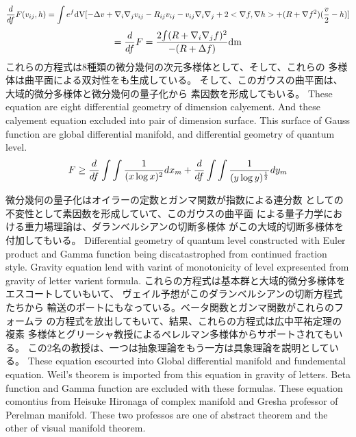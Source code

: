 \documentclass{jsarticle}
\begin{document}
  $$ {d \over d f}F(v_{ij},h) = \int {e^{f}\mathrm{dV}}
  [- \Delta v + \nabla_{i}\nabla_{j}
  v_{ij} - R_{ij}v_{ij} - v_{ij}\nabla_{i}\nabla_{j} + 2 <\nabla f,\nabla h>
  + (R + \nabla f^2)({v \over 2} - h)]$$
  $$ = {d \over d f}F = {2 {\int (R + \nabla_{i}\nabla_{j} f)^2} \over 
  { - (R + \Delta f)}}\mathrm{dm} $$
  これらの方程式は8種類の微分幾何の次元多様体として、そして、これらの
  多様体は曲平面による双対性をも生成している。 
  そして、このガウスの曲平面は、大域的微分多様体と微分幾何の量子化から
  素因数を形成してもいる。
  These equation are eight differential geometry of dimension calyement.
  And these calyement equation excluded into pair of dimension surface.
  This surface of Gauss function are global differential manifold,
  and differential geometry of quantum level.
  $$ F \ge {d \over d f}\int \int{1 \over (x \log x)^2}dx_m 
  + {d \over d f}\int \int{1 \over (y \log y)^{1 \over 2}}dy_m $$

  微分幾何の量子化はオイラーの定数とガンマ関数が指数による連分数
  としての不変性として素因数を形成していて、このガウスの曲平面
  による量子力学における重力場理論は、ダランベルシアンの切断多様体
  がこの大域的切断多様体を付加してもいる。
  Differential geometry of quantum level constructed with Euler product
  and Gamma function being discatastrophed from continued fraction style.
  Gravity equation lend with varint of monotonicity of level expresented
  from gravity of letter varient formula.
  これらの方程式は基本群と大域的微分多様体をエスコートしていもいて、
  ヴェイル予想がこのダランベルシアンの切断方程式たちから
  輸送のポートにもなっている。ベータ関数とガンマ関数がこれらのフォームラ
  の方程式を放出してもいて、結果、これらの方程式は広中平祐定理の複素
  多様体とグリーシャ教授によるペレルマン多様体からサポートされてもいる。
  この2名の教授は、一つは抽象理論をもう一方は具象理論を説明としている。
  These equation escourted into Global differential manifold and
  fundemental equation.
  Weil's theorem is imported from this equation in gravity of letters.
  Beta function and Gamma function are excluded with these formulas.
  These equation comontius from Heisuke Hironaga of complex manifold
  and Gresha professor of Perelman manifold.
  These two professos are one of abstract theorem and the other of
  visual manifold theorem.
\end{document}
